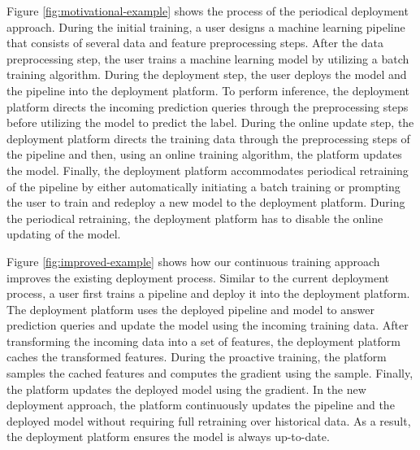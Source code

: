 Figure \ref{fig:motivational-example} shows the process of the periodical deployment approach.
During the initial training, a user designs a machine learning pipeline that consists of several data and feature preprocessing steps. After the data preprocessing step, the user trains a machine learning model by utilizing a batch training algorithm.
During the deployment step, the user deploys the model and the pipeline into the deployment platform.
To perform inference, the deployment platform directs the incoming prediction queries through the preprocessing steps before utilizing the model to predict the label.
During the online update step, the deployment platform directs the training data through the preprocessing steps of the pipeline and then, using an online training algorithm, the platform updates the model.
Finally, the deployment platform accommodates periodical retraining of the pipeline by either automatically initiating a batch training or prompting the user to train and redeploy a new model to the deployment platform.
During the periodical retraining, the deployment platform has to disable the online updating of the model.

Figure \ref{fig:improved-example} shows how our continuous training approach improves the existing deployment process.
Similar to the current deployment process, a user first trains a pipeline and deploy it into the deployment platform.
The deployment platform uses the deployed pipeline and model to answer prediction queries and update the model using the incoming training data.
After transforming the incoming data into a set of features, the deployment platform caches the transformed features.
During the proactive training, the platform samples the cached features and computes the gradient using the sample.
Finally, the platform updates the deployed model using the gradient.
In the new deployment approach, the platform continuously updates the pipeline and the deployed model without requiring full retraining over historical data.
As a result, the deployment platform ensures the model is always up-to-date.